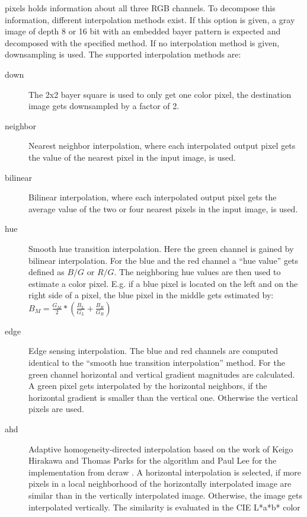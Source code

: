 \begin{description}
  pixels holds information about all three RGB channels. To
  decompose this information, different interpolation methods
  exist. If this option is given, a gray image of depth 8 or 16 bit
  with an embedded bayer pattern is expected and decomposed with the
  specified method. If no interpolation method is given,
  downsampling is used. The supported interpolation methods are:
  \begin{description}
  \item[down] The 2x2 bayer square is used to only get one color
    pixel, the destination image gets downsampled by a factor of 2.
  \item[neighbor] Nearest neighbor interpolation, where each
    interpolated output pixel gets the value of the nearest pixel in
    the input image, is used.
  \item[bilinear] Bilinear interpolation, where each
    interpolated output pixel gets the average value of the two or
    four nearest pixels in the input image, is used.
  \item[hue] Smooth hue transition interpolation. Here the green
    channel is gained by bilinear interpolation. For the blue and
    the red channel a ``hue value'' gets defined as $B/G$ or
    $R/G$. The neighboring hue values are then used to estimate a
    color pixel. E.g. if a blue pixel is located on the left and on
    the right side of a pixel, the blue pixel in the middle gets
    estimated by:\\
    $B_M = \frac{G_M}{2} * \left(\frac{B_L}{G_L}+\frac{B_R}{G_R}\right)$
  \item[edge] Edge sensing interpolation. The blue and red channels
    are computed identical to the ``smooth hue transition
    interpolation'' method. For the green channel horizontal and
    vertical gradient magnitudes are calculated. A green pixel gets
    interpolated by the horizontal neighbors, if the horizontal
    gradient is smaller than the vertical one. Otherwise the
    vertical pixels are used.
  \item[ahd] Adaptive homogeneity-directed interpolation based on
    the work of Keigo Hirakawa and Thomas Parks for the algorithm
    \cite{Hirakawa2005-AHD} and Paul Lee for the implementation from
    dcraw \cite{dcraw2006}. A horizontal interpolation is selected,
    if more pixels in a local neighborhood of the horizontally
    interpolated image are similar than in the vertically
    interpolated image. Otherwise, the image gets interpolated
    vertically. The similarity is evaluated in the CIE L*a*b* color

\end{description}
\end{description}
